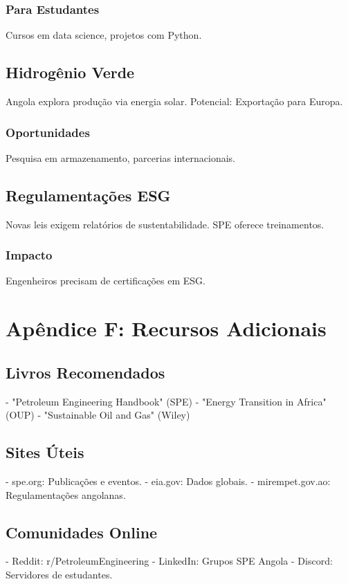 \documentclass[12pt]{article}
\begin{document}
\subsubsection{Para Estudantes}
Cursos em data science, projetos com Python.

\subsection{Hidrogênio Verde}
Angola explora produção via energia solar. Potencial: Exportação para Europa.

\subsubsection{Oportunidades}
Pesquisa em armazenamento, parcerias internacionais.

\subsection{Regulamentações ESG}
Novas leis exigem relatórios de sustentabilidade. SPE oferece treinamentos.

\subsubsection{Impacto}
Engenheiros precisam de certificações em ESG.

\section{Apêndice F: Recursos Adicionais}

\subsection{Livros Recomendados}
- "Petroleum Engineering Handbook" (SPE)
- "Energy Transition in Africa" (OUP)
- "Sustainable Oil and Gas" (Wiley)

\subsection{Sites Úteis}
- spe.org: Publicações e eventos.
- eia.gov: Dados globais.
- mirempet.gov.ao: Regulamentações angolanas.

\subsection{Comunidades Online}
- Reddit: r/PetroleumEngineering
- LinkedIn: Grupos SPE Angola
- Discord: Servidores de estudantes.
\end{document}
